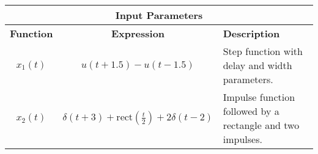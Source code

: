 \documentclass{article}
\begin{document}
\begin{table}[htbp]
    \centering
    \begin{tabular}{|c|c|p{6cm}|}
        \hline
        \multicolumn{3}{|c|}{\textbf{Input Parameters}} \\
        \hline
        \textbf{Function} & \textbf{Expression} & \textbf{Description} \\
        \hline
        $x_1(t)$ & $u(t + 1.5) - u(t - 1.5)$ & Step function with delay and width parameters. \\
        $x_2(t)$ & $\delta(t + 3) + \text{rect}\left(\frac{t}{2}\right) + 2\delta(t - 2)$ & Impulse function followed by a rectangle and two impulses. \\
        \hline
    \end{tabular}
\end{table}
\end{document}
